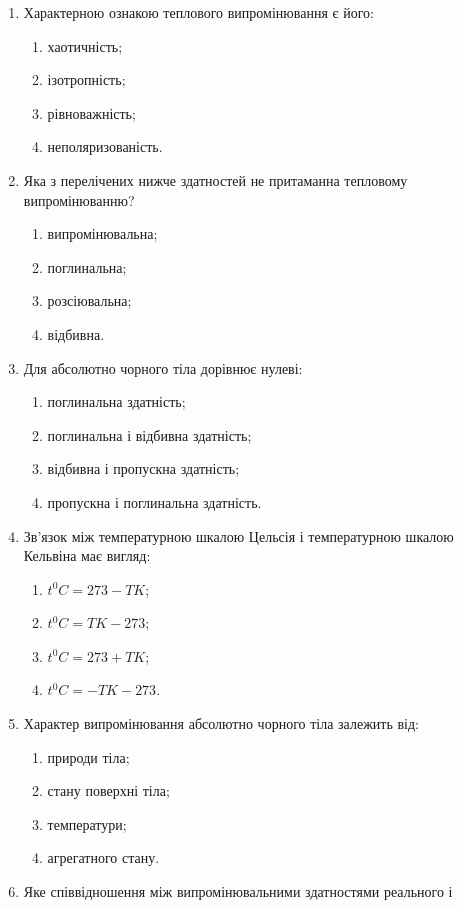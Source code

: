 \documentclass[twocolumn]{el-author}
\begin{document}
\begin{enumerate}
	\item Характерною ознакою теплового випромінювання є його:
	\begin{enumerate}
		\item хаотичність;
		\item ізотропність;
		\item рівноважність;
		\item неполяризованість.
	\end{enumerate}
	\item Яка з перелічених нижче здатностей не притаманна тепловому
випромінюванню?
	\begin{enumerate}
		\item випромінювальна;
		\item поглинальна;
		\item розсіювальна;
		\item відбивна.
	\end{enumerate}
	\item Для абсолютно чорного тіла дорівнює нулеві:
	\begin{enumerate}
		\item поглинальна здатність;
		\item поглинальна і відбивна здатність;
		\item відбивна і пропускна здатність;
		\item пропускна і поглинальна здатність.
	\end{enumerate}
	\item Зв'язок між температурною шкалою Цельсія і температурною шкалою
Кельвіна має вигляд:
	\begin{enumerate}
		\item $t^{0}C = 273 - TK$;
		\item $t^{0}C = TK - 273$;
		\item $t^{0}C = 273 + TK$;
		\item $t^{0}C = -TK -273$.
	\end{enumerate}
	\item Характер випромінювання абсолютно чорного тіла залежить від:
	\begin{enumerate}
		\item природи тіла;
		\item стану поверхні тіла;
		\item температури;
		\item агрегатного стану.
	\end{enumerate}
	\item Яке співвідношення між випромінювальними здатностями реального і

\end{enumerate}
\end{document}
